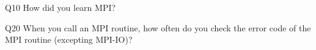 \begin{description}%
\item{Q10} How did you learn MPI?%
\item{Q20} When you call an MPI routine, how often do you check the error code of the MPI routine  (excepting MPI-IO)?%
\end{description}%
